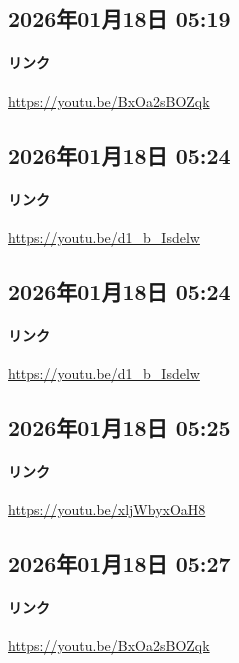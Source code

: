 \subsection*{2026年01月18日 05:19}

\paragraph{リンク}
\url{https://youtu.be/BxOa2sBOZqk}

\subsection*{2026年01月18日 05:24}

\paragraph{リンク}
\url{https://youtu.be/d1_b_Isdelw}

\subsection*{2026年01月18日 05:24}

\paragraph{リンク}
\url{https://youtu.be/d1_b_Isdelw}

\subsection*{2026年01月18日 05:25}

\paragraph{リンク}
\url{https://youtu.be/xljWbyxOaH8}

\subsection*{2026年01月18日 05:27}

\paragraph{リンク}
\url{https://youtu.be/BxOa2sBOZqk}

